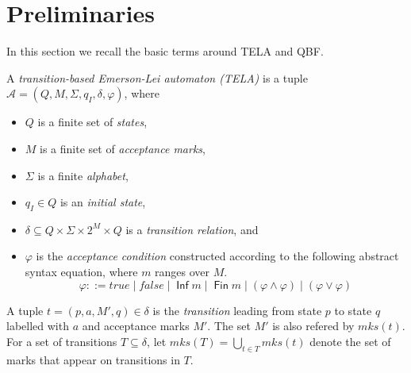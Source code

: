 \documentclass[a4paper,UKenglish,cleveref,autoref,thm-restate]{lipics-v2021}
\DeclareMathOperator{\Inf}{\mathsf{Inf}}
\DeclareMathOperator{\Fin}{\mathsf{Fin}}
\newcommand{\minf}{\mathit{inf}}
\newcommand{\mks}{\mathit{mks}}
\def\false{\mathit{false}}
\def\true{\mathit{true}}
\newcommand{\mA}{\mathcal{A}}
\begin{document}

\section{Preliminaries}\label{sec:prelim}

In this section we recall the basic terms around TELA and QBF.

\begin{definition}[TELA]
  A \emph{transition-based Emerson-Lei automaton (TELA)} is a tuple
  $\mA =(Q,M,\Sigma,q_I,\delta,\varphi)$, where
  \begin{itemize}
  \item $Q$ is a finite set of \emph{states},
  \item $M$ is a finite set of \emph{acceptance marks},
  \item $\Sigma$ is a finite \emph{alphabet},
  \item $q_I\in Q$ is an \emph{initial state},
  \item $\delta \subseteq Q \times \Sigma \times 2^{M} \times Q$ is a
    \emph{transition relation}, and
  \item $\varphi$ is the \emph{acceptance condition} constructed
    according to the following abstract syntax equation, where $m$
    ranges over $M$.
    $$\varphi ::= \true \mid \false \mid \Inf m \mid \Fin m \mid \left( \varphi \land \varphi \right) \mid \left( \varphi \lor \varphi \right)$$
\end{itemize}
\end{definition}

A tuple $t=(p,a,M',q)\in\delta$ is the \emph{transition} leading from
state $p$ to state $q$ labelled with $a$ and acceptance marks $M'$.
The set $M'$ is also refered by $\mks(t)$. For a set of transitions
$T\subseteq\delta$, let $\mks(T)=\bigcup_{t\in T}\mks(t)$ denote the
set of marks that appear on transitions in $T$.
\end{document}
